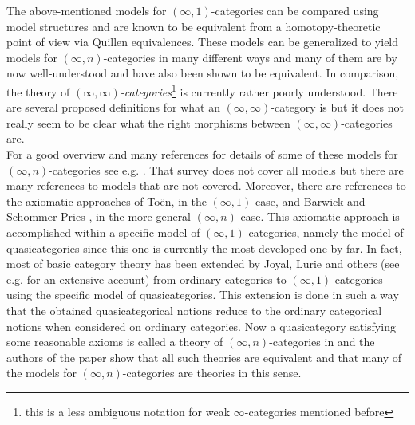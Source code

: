 The above-mentioned models for $(\infty,1)$-categories can be compared using model structures and are known to be equivalent from a homotopy-theoretic point of view via Quillen equivalences. These models can be generalized to yield models for $(\infty,n)$-categories in many different ways and many of them are by now well-understood and have also been shown to be equivalent. In comparison, the theory of \textit{$(\infty,\infty)$-categories}\footnote{this is a less ambiguous notation for weak $\infty$-categories mentioned before} is currently rather poorly understood. There are several proposed definitions for what an $(\infty,\infty)$-category is but it does not really seem to be clear what the right morphisms between $(\infty,\infty)$-categories are.
\\
For a good overview and many references for details of some of these models for $(\infty,n)$-categories see e.g. \cite{f3c68a99}. That survey does not cover all models but there are many references to models that are not covered. Moreover, there are references to the axiomatic approaches of To\"en, in the $(\infty,1)$-case, and Barwick and Schommer-Pries \cite{6f59ab3c}, in the more general $(\infty,n)$-case. This axiomatic approach is accomplished within a specific model of $(\infty,1)$-categories, namely the model of quasicategories since this one is currently the most-developed one by far. In fact, most of basic category theory has been extended by Joyal, Lurie and others (see e.g. \cite{0349e8ea} for an extensive account) from ordinary categories to $(\infty,1)$-categories using the specific model of quasicategories. This extension is done in such a way that the obtained quasicategorical notions reduce to the ordinary categorical notions when considered on ordinary categories. Now a quasicategory satisfying some reasonable axioms is called a theory of $(\infty,n)$-categories in \cite{6f59ab3c} and the authors of the paper show that all such theories are equivalent and that many of the models for $(\infty,n)$-categories are theories in this sense.
\\
